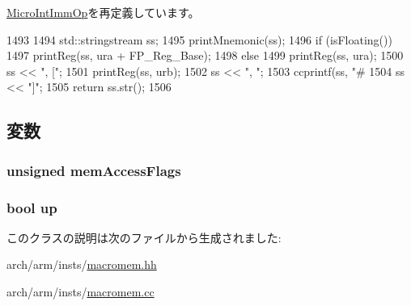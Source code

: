 \hyperlink{classArmISA_1_1MicroIntImmOp_a95d323a22a5f07e14d6b4c9385a91896}{MicroIntImmOp}を再定義しています。


\begin{DoxyCode}
1493 {
1494     std::stringstream ss;
1495     printMnemonic(ss);
1496     if (isFloating())
1497         printReg(ss, ura + FP_Reg_Base);
1498     else
1499         printReg(ss, ura);
1500     ss << ", [";
1501     printReg(ss, urb);
1502     ss << ", ";
1503     ccprintf(ss, "#%
1504     ss << "]";
1505     return ss.str();
1506 }
\end{DoxyCode}


\subsection{変数}
\hypertarget{classArmISA_1_1MicroMemOp_a827c936c9e2b1f1cf21a01f204a8d821}{
\subsubsection[{memAccessFlags}]{\setlength{\rightskip}{0pt plus 5cm}unsigned {\bf memAccessFlags}}}
\label{classArmISA_1_1MicroMemOp_a827c936c9e2b1f1cf21a01f204a8d821}
\hypertarget{classArmISA_1_1MicroMemOp_a7155f867ab504d48e40f4b43a4d9daf6}{
\subsubsection[{up}]{\setlength{\rightskip}{0pt plus 5cm}bool {\bf up}}}
\label{classArmISA_1_1MicroMemOp_a7155f867ab504d48e40f4b43a4d9daf6}


このクラスの説明は次のファイルから生成されました:\begin{DoxyCompactItemize}
\item 
arch/arm/insts/\hyperlink{macromem_8hh}{macromem.hh}\item 
arch/arm/insts/\hyperlink{macromem_8cc}{macromem.cc}\end{DoxyCompactItemize}
